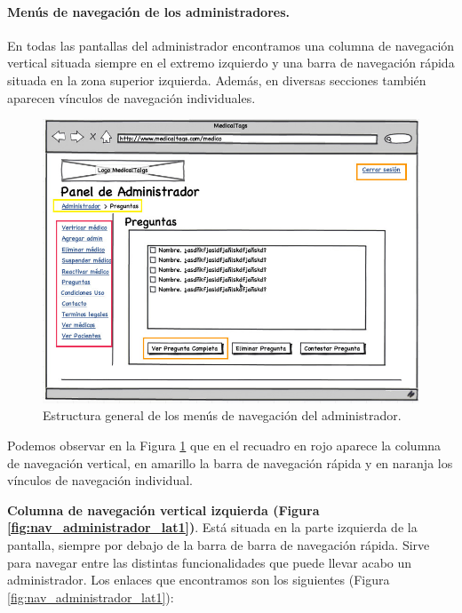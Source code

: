 \documentclass[a4paper,oneside,11pt]{book}
\begin{document}
		
		\paragraph{Menús de navegación de los administradores.} %
		\label{par:nav_menus_de_navegacion_de_los_administradores}
		
		En todas las pantallas del administrador encontramos una columna de navegación vertical situada siempre en el extremo izquierdo y una barra de navegación rápida situada en la zona superior izquierda. Además, en diversas secciones también aparecen vínculos de navegación individuales.
		
		\begin{figure}[H]
		  \centering
		    \includegraphics[width=15cm]{img/jpg/nav/administrador.jpg}
		  \caption{Estructura general de los menús de navegación del administrador.}
		  \label{fig:nav_administrador}
		\end{figure}
		
		Podemos observar en la Figura \ref{fig:nav_administrador} que en el recuadro en rojo aparece la columna de navegación vertical, en amarillo la barra de navegación rápida y en naranja los vínculos de navegación individual.
		
		\textbf{Columna de navegación vertical izquierda (Figura \ref{fig:nav_administrador_lat1})}. Está situada en la parte izquierda de la pantalla, siempre por debajo de la barra de  barra de navegación rápida. Sirve para navegar entre las distintas funcionalidades que puede llevar acabo un administrador. Los enlaces que encontramos son los siguientes (Figura \ref{fig:nav_administrador_lat1}):
		
\end{document}
